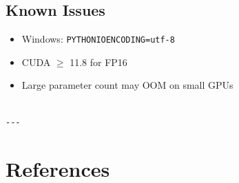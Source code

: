 \subsection{Known Issues}

\begin{itemize}
\item Windows: \texttt{PYTHONIOENCODING=utf-8}
\item CUDA $\ge$ 11.8 for FP16
\item Large parameter count may OOM on small GPUs
\end{itemize}
\begin{lstlisting}

---
\end{lstlisting}

\section{References}

